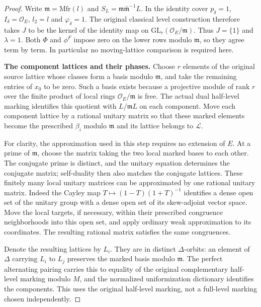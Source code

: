 \begin{proof}
Write $\mathfrak m=\mathrm{Mfr}(l)$ and $S_L=
\mathfrak m\bar{\mathfrak m}^{-1}L$. In the identity cover
$p_\delta=1$, $I_\delta=\mathcal O_E$, $l_2=l$ and
$\varphi_\delta=1$. The original classical level construction
therefore takes $J$ to be the kernel of the identity map on
$\mathrm{GL}_r(\mathcal O_E/\mathfrak m)$. Thus $J=\{1\}$
and $\lambda=1$. Both $\Phi$ and $\phi^F$ impose zero on
the lower rows modulo $\mathfrak m$, so they agree term by term.
In particular no moving-lattice comparison is required here.

\textbf{The component lattices and their phases.}
Choose $r$ elements of the original source lattice whose classes
form a basis modulo $\mathfrak m$, and take the remaining entries
of $x_0$ to be zero. Such a basis exists because a projective
module of rank $r$ over the finite product of local rings
$\mathcal O_E/\mathfrak m$ is free. The actual dual half-level
marking identifies this quotient with $L/\mathfrak mL$ on each
component. Move each component lattice by a rational unitary
matrix so that these marked elements become the prescribed
$\beta_i$ modulo $\mathfrak m$ and its lattice belongs to
$\mathcal L$.

For clarity, the approximation used in this step requires no
extension of $E$. At a prime of $\mathfrak m$, choose the
matrix taking the two local marked bases to each other. The
conjugate prime is distinct, and the unitary equation determines
the conjugate matrix; self-duality then also matches the
conjugate lattices. These finitely many local unitary matrices
can be approximated by one rational unitary matrix. Indeed the
Cayley map $T\mapsto(1-T)(1+T)^{-1}$ identifies a dense open
set of the unitary group with a dense open set of its
skew-adjoint vector space. Move the local targets, if necessary,
within their prescribed congruence neighborhoods into this open
set, and apply ordinary weak approximation to its coordinates.
The resulting rational matrix satisfies the same congruences.

Denote the resulting lattices by $L_i$. They are in distinct
$\Delta$-orbits: an element of $\Delta$ carrying $L_i$ to
$L_j$ preserves the marked basis modulo $\mathfrak m$.
The perfect alternating pairing carries this to equality of the
original complementary half-level marking modulo $M$, and the
normalized uniformization dictionary identifies the components.
This uses the original half-level marking, not a full-level
marking chosen independently.


\end{proof}
